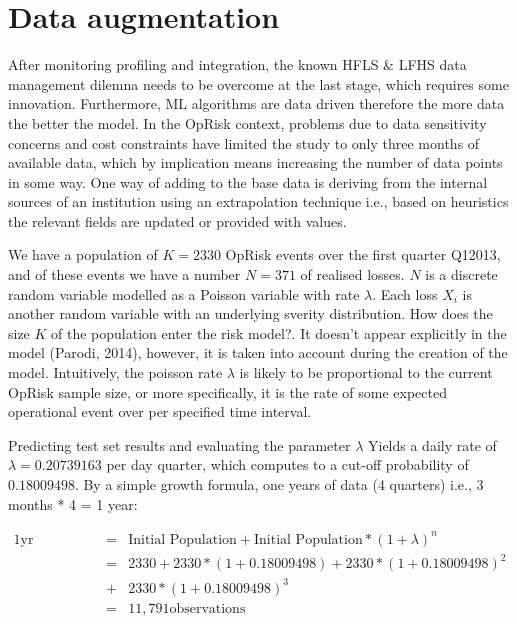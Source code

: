 \documentclass{DissertateUSU}
\begin{document}
\section{Data augmentation}

After monitoring profiling and integration, the known HFLS \& LFHS data
management dilemna needs to be overcome at the last stage, which
requires some innovation. Furthermore, ML algorithms are data driven
therefore the more data the better the model. In the OpRisk context,
problems due to data sensitivity concerns and cost constraints have
limited the study to only three months of available data, which by
implication means increasing the number of data points in some way. One
way of adding to the base data is deriving from the internal sources of
an institution using an extrapolation technique i.e., based on
heuristics the relevant fields are updated or provided with
values.\medskip 

We have a population of \(K = 2330\) OpRisk events over the first
quarter Q12013, and of these events we have a number \(N = 371\) of
realised losses. \(N\) is a discrete random variable modelled as a
Poisson variable with rate \(\lambda\). Each loss \(X_i\) is another
random variable with an underlying sverity distribution. How does the
size \(K\) of the population enter the risk model?. It doesn't appear
explicitly in the model (Parodi, 2014), however, it is taken into
account during the creation of the model. Intuitively, the poisson rate
\(\lambda\) is likely to be proportional to the current OpRisk sample
size, or more specifically, it is the rate of some expected operational
event over per specified time interval.\medskip

\singlespacing

\doublespacing

Predicting test set results and evaluating the parameter \(\lambda\)
Yields a daily rate of \(\lambda = 0.20739163\) per day quarter, which
computes to a cut-off probability of \(0.18009498\). By a simple growth
formula, one years of data (4 quarters) i.e., 3 months * 4 = 1 year:

\singlespacing

\begin{eqnarray}
\mbox{1yr Population} &=& \mbox{Initial Population} + \mbox{Initial Population} * (1 + \lambda)^n \nonumber \\
 &=& 2330 + 2330*(1+0.18009498) + 2330*(1+0.18009498)^2 \nonumber \\
 &+& 2330*(1+0.18009498)^3\nonumber \\
 &=& 11,791 \mbox{observations}
\end{eqnarray} \doublespacing
\end{document}
